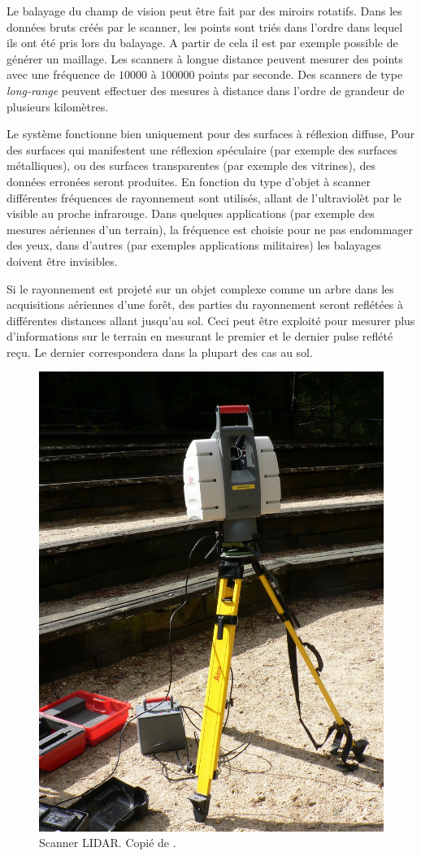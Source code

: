 \documentclass[a4paper,10pt]{scrreprt}
\begin{document}
Le balayage du champ de vision peut être fait par des miroirs rotatifs. Dans les données bruts créés par le scanner, les points sont triés dans l'ordre dans lequel ils ont été pris lors du balayage. A partir de cela il est par exemple possible de générer un maillage. Les scanners à longue distance peuvent mesurer des points avec une fréquence de $10000$ à $100000$ points par seconde. Des scanners de type \emph{long-range} peuvent effectuer des mesures à distance dans l'ordre de grandeur de plusieurs kilomètres.

Le système fonctionne bien uniquement pour des surfaces à réflexion diffuse, Pour des surfaces qui manifestent une réflexion spéculaire (par exemple des surfaces métalliques), ou des surfaces transparentes (par exemple des vitrines), des données erronées seront produites. En fonction du type d'objet à scanner différentes fréquences de rayonnement sont utilisés, allant de l'ultraviolèt par le visible au proche infrarouge. Dans quelques applications (par exemple des mesures aériennes d'un terrain), la fréquence est choisie pour ne pas endommager des yeux, dans d'autres (par exemples applications militaires) les balayages doivent être invisibles.

Si le rayonnement est projeté sur un objet complexe comme un arbre dans les acquisitions aériennes d'une forêt, des parties du rayonnement seront reflétées à différentes distances allant jusqu'au sol. Ceci peut être exploité pour mesurer plus d'informations sur le terrain en mesurant le premier et le dernier pulse reflété reçu. Le dernier correspondera dans la plupart des cas au sol.

\begin{figure}[p]
\center
\includegraphics[width=.4\textwidth]{lidar.jpg}
\caption[Scanner LIDAR]{Scanner LIDAR. Copié de \cite{Web2}.}
\label{fig:lidar}
\end{figure}
\end{document}
